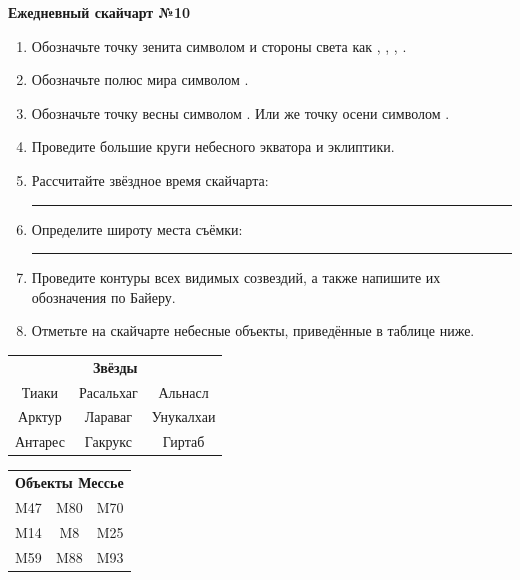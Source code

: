 \documentclass{./SAS-class-skygen}
\begin{document}
    
    
    
	\begin{center}
		\large\textbf{Ежедневный скайчарт №10}
	\end{center}

	\begin{enumerate}
		\item Обозначьте точку зенита символом  и стороны света как , , , .
		\item Обозначьте полюс мира символом .
		\item Обозначьте точку весны символом \Aries. Или же точку осени символом \Libra.
		\item Проведите большие круги небесного экватора и эклиптики.
		\item Рассчитайте звёздное время скайчарта: \rule{2cm}{0.4pt}
		\item Определите широту места съёмки: \rule{2cm}{0.4pt}
		\item Проведите контуры всех видимых созвездий, а также напишите их обозначения по Байеру.
		\item Отметьте на скайчарте небесные объекты, приведённые в таблице ниже.
	\end{enumerate}
	
    \vspace{0.5cm}

    \begin{table}[h!]
    \centering
    \begin{tabular}{ccc}
    \multicolumn{3}{c}{\textbf{Звёзды}} \\ Тиаки & Расальхаг & Альнасл \\
Арктур & Лараваг & Унукалхаи \\
Антарес & Гакрукс & Гиртаб \\

\end{tabular}
    \hfill
    \begin{tabular}{ccc}
    \multicolumn{3}{c}{\textbf{Объекты Мессье}} \\ M47 & M80 & M70 \\
M14 & M8 & M25 \\
M59 & M88 & M93 \\

\end{tabular}
    \end{table}
	
\end{document}
